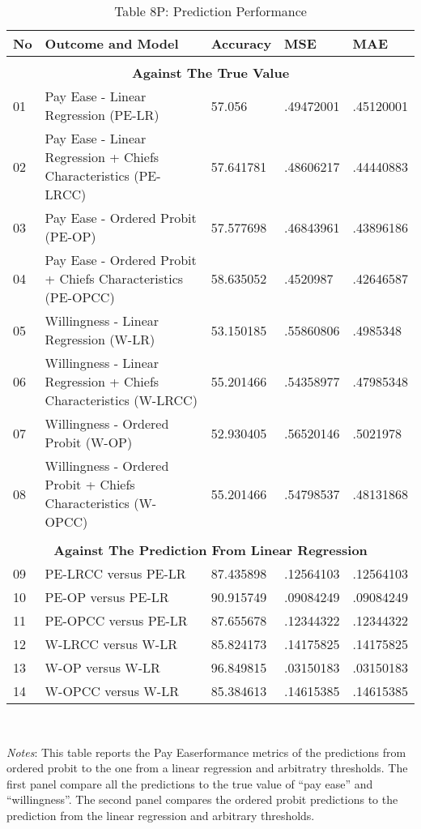 \begin{table}[H]
\caption*{Table 8P: Prediction Performance}
\centering
\centerfloat
\begin{tabular}{|l|l|l|l|l|}\hline  
\textbf{No} & \textbf{Outcome and Model}& \textbf{Accuracy}  & \textbf{MSE}  & \textbf{MAE}  \\ \hline  
 \multicolumn{5}{c}{ } \\
 \multicolumn{5}{c}{\textbf{Against The True Value}} \\\hline
01&Pay Ease - Linear Regression (PE-LR)  & 57.056 & .49472001 & .45120001 \\ \hline 
02&Pay Ease - Linear Regression + Chiefs Characteristics (PE-LRCC) & 57.641781 & .48606217 & .44440883 \\ \hline 
03&Pay Ease - Ordered Probit (PE-OP) & 57.577698 & .46843961 & .43896186 \\ \hline 
04&Pay Ease - Ordered Probit + Chiefs Characteristics (PE-OPCC) & 58.635052 & .4520987 & .42646587 \\ \hline 
05&Willingness - Linear Regression (W-LR) & 53.150185 & .55860806 & .4985348 \\ \hline 
06&Willingness - Linear Regression + Chiefs Characteristics (W-LRCC)  & 55.201466 & .54358977 & .47985348 \\ \hline 
07&Willingness - Ordered Probit (W-OP)& 52.930405 & .56520146 & .5021978 \\ \hline 
08&Willingness - Ordered Probit + Chiefs Characteristics (W-OPCC) & 55.201466 & .54798537 & .48131868 \\ \hline 

 \multicolumn{5}{c}{ } \\
\multicolumn{5}{c}{\textbf{Against The Prediction From Linear Regression }} \\\hline

09&PE-LRCC versus PE-LR  & 87.435898 & .12564103 & .12564103 \\ \hline 
10&PE-OP versus PE-LR  & 90.915749 & .09084249 & .09084249 \\ \hline 
11&PE-OPCC versus PE-LR  & 87.655678 & .12344322 & .12344322 \\ \hline 
12&W-LRCC versus W-LR  & 85.824173 & .14175825 & .14175825 \\ \hline 
13&W-OP versus W-LR  & 96.849815 & .03150183 & .03150183 \\ \hline 
14&W-OPCC versus W-LR  & 85.384613 & .14615385 & .14615385 \\ \hline 
  \end{tabular}
\usebox{\tablebox}\\[1ex]
\parbox{7.5in}{\small \textit{Notes}: This table reports the Pay Easerformance metrics of the predictions from ordered probit to the one from a linear regression and arbitratry thresholds. The first panel compare all the predictions to the true value of  \enquote{pay ease} and \enquote{willingness}. The second panel compares the ordered probit predictions  to the prediction from the linear regression and arbitrary thresholds.}
\end{table}
